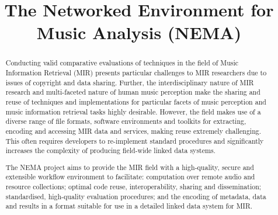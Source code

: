 \documentclass[conference]{IEEEtran}
\begin{document}
%
\title{The Networked Environment for Music Analysis (NEMA)}



\author{
}


\maketitle

\begin{abstract}
Conducting valid comparative evaluations of techniques in the field of Music Information Retrieval (MIR) presents particular challenges to MIR researchers due to issues of copyright and data sharing. Further, the interdisciplinary nature of MIR research and multi-faceted nature of human music perception make the sharing and reuse of techniques and implementations for particular facets of music perception and music information retrieval tasks highly desirable. However, the field makes use of a diverse range of file formats, software environments and toolkits for extracting, encoding and accessing MIR data and services, making reuse extremely challenging. This often requires developers to re-implement standard procedures and significantly increases the complexity of producing field-wide linked data systems. 

The NEMA project aims to provide the MIR field with a high-quality, secure and extensible workflow environment to facilitate: computation over remote audio and resource collections; optimal code reuse, interoperability, sharing and dissemination; standardised, high-quality evaluation procedures; and the encoding of metadata, data and results in a format suitable for use in a detailed linked data system for MIR. 

\end{abstract}
\end{document}
